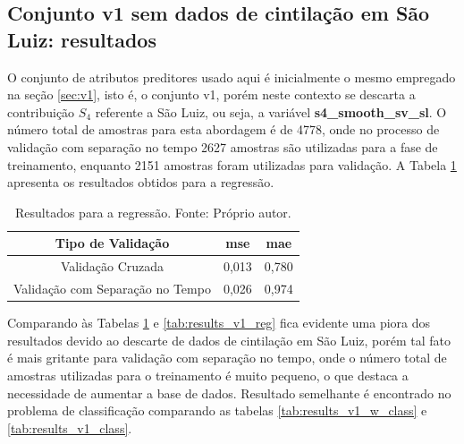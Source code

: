 \subsection{Conjunto v1 sem dados de cintilação em São Luiz: resultados}

O conjunto de atributos preditores usado aqui é inicialmente o mesmo empregado na seção \ref{sec:v1}, isto é, o conjunto v1, porém neste contexto se descarta a contribuição $S_4$ referente a São Luiz, ou seja, a variável {\bf s4\_smooth\_sv\_sl}. O número total de amostras para esta abordagem é de 4778, onde no processo de validação com separação no tempo 2627 amostras são utilizadas para a fase de treinamento, enquanto 2151 amostras foram utilizadas para validação. A Tabela \ref{tab:results_v1_w_reg} apresenta os resultados obtidos para a regressão.

\begin{table}[h]
\begin{center}
\begin{tabular}{|c|c|c|}
\hline
Tipo de Validação & mse       & mae   \\ \hline
Validação Cruzada                   & 0,013   & 0,780  \\ \hline
Validação com Separação no Tempo    & 0,026   & 0,974  \\ \hline
\end{tabular}
\end{center}
\vspace{12pt}
\caption{Resultados para a regressão. Fonte: Próprio autor.}
\label{tab:results_v1_w_reg}
\end{table}

Comparando às Tabelas \ref{tab:results_v1_w_reg} e \ref{tab:results_v1_reg} fica evidente uma piora dos resultados devido ao descarte de dados de cintilação em São Luiz, porém tal fato é mais gritante para validação com separação no tempo, onde o número total de amostras utilizadas para o treinamento é muito pequeno, o que destaca a necessidade de aumentar a base de dados. Resultado semelhante é encontrado no problema de classificação comparando as tabelas \ref{tab:results_v1_w_class} e \ref{tab:results_v1_class}.

